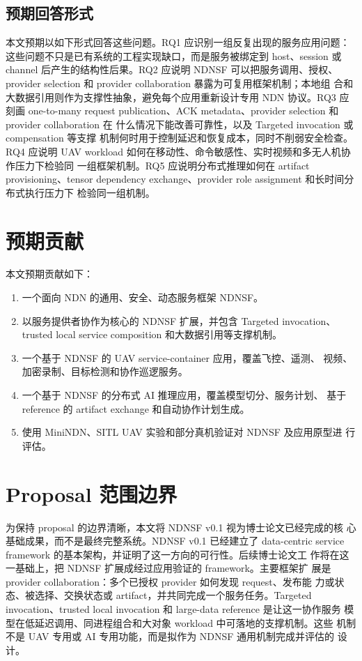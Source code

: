 \subsection{预期回答形式}

本文预期以如下形式回答这些问题。RQ1 应识别一组反复出现的服务应用问题：
这些问题不只是已有系统的工程实现缺口，而是服务被绑定到 host、session 或
channel 后产生的结构性后果。RQ2 应说明 NDNSF 可以把服务调用、授权、
provider selection 和 provider collaboration 暴露为可复用框架机制；本地组
合和大数据引用则作为支撑性抽象，避免每个应用重新设计专用 NDN 协议。RQ3 应刻画 one-to-many request
publication、ACK metadata、provider selection 和 provider collaboration 在
什么情况下能改善可靠性，以及 Targeted invocation 或 compensation 等支撑
机制何时用于控制延迟和恢复成本，同时不削弱安全检查。RQ4 应说明 UAV
workload 如何在移动性、命令敏感性、实时视频和多无人机协作压力下检验同
一组框架机制。RQ5 应说明分布式推理如何在 artifact provisioning、tensor
dependency exchange、provider role assignment 和长时间分布式执行压力下
检验同一组机制。

\section{预期贡献}

本文预期贡献如下：

\begin{enumerate}[leftmargin=*]
  \item 一个面向 NDN 的通用、安全、动态服务框架 NDNSF。
  \item 以服务提供者协作为核心的 NDNSF 扩展，并包含 Targeted invocation、
  trusted local service composition 和大数据引用等支撑机制。
  \item 一个基于 NDNSF 的 UAV service-container 应用，覆盖飞控、遥测、
  视频、加密录制、目标检测和协作巡逻服务。
  \item 一个基于 NDNSF 的分布式 AI 推理应用，覆盖模型切分、服务计划、
  基于 reference 的 artifact exchange 和自动协作计划生成。
  \item 使用 MiniNDN、SITL UAV 实验和部分真机验证对 NDNSF 及应用原型进
  行评估。
\end{enumerate}

\section{Proposal 范围边界}

为保持 proposal 的边界清晰，本文将 NDNSF v0.1 视为博士论文已经完成的核
心基础成果，而不是最终完整系统。NDNSF v0.1 已经建立了 data-centric
service framework 的基本架构，并证明了这一方向的可行性。后续博士论文工
作将在这一基础上，把 NDNSF 扩展成经过应用验证的 framework。主要框架扩
展是 provider collaboration：多个已授权 provider 如何发现 request、发布能
力或状态、被选择、交换状态或 artifact，并共同完成一个服务任务。Targeted
invocation、trusted local invocation 和 large-data reference 是让这一协作服务
模型在低延迟调用、同进程组合和大对象 workload 中可落地的支撑机制。这些
机制不是 UAV 专用或 AI 专用功能，而是拟作为 NDNSF 通用机制完成并评估的
设计。

